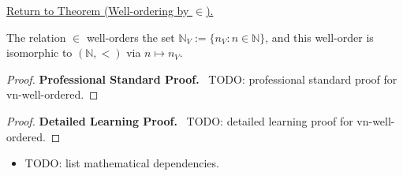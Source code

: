 \newpage
{}
\label{prf:vn-well-ordered}

\begin{remark*}[Return]
\hyperref[prop:vn-well-ordered]{Return to Theorem (Well-ordering by $\in$).}
\end{remark*}

\begin{theorem*}
The relation $\in$ well-orders the set $\mathbb{N}_V := \{n_V : n\in\mathbb{N}\}$,
and this well-order is isomorphic to $(\mathbb{N},<)$ via $n\mapsto n_V$.
\end{theorem*}

\begin{proof}
\textbf{Professional Standard Proof.}~
TODO: professional standard proof for vn-well-ordered.
\end{proof}

\begin{proof}
\textbf{Detailed Learning Proof.}~
TODO: detailed learning proof for vn-well-ordered.
\end{proof}

\begin{remark*}
\end{remark*}

\begin{dependencies}
\begin{itemize}
  \item TODO: list mathematical dependencies.
\end{itemize}
\end{dependencies}

\clearpage
